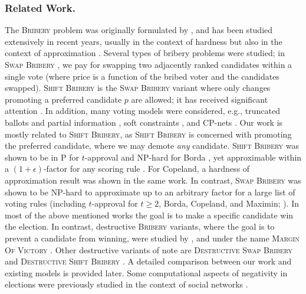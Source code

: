 \documentclass[letterpaper]{article} %
\newcommand{\Bribery}{\textsc{Bribery}}
\newcommand{\swapB}{\textsc{Swap Bribery}}
\newcommand{\shiftB}{\textsc{Shift Bribery}}
\newcommand{\DshiftB}{\textsc{Destructive} \shiftB{}}
\newcommand{\NP}{\mathrm{NP}}
\newcommand{\Pclass}{\mathrm{P}}
\begin{document}
\subsubsection{Related Work.}
The \Bribery{} problem was originally formulated by  \citet{faliszewski2006complexity,DBLP:journals/jair/FaliszewskiHH09}, and has been studied extensively in recent years, usually in the context of hardness \citep[see a survey by][]{DBLP:reference/choice/FaliszewskiR16} but also in the context of approximation \cite{DBLP:conf/atal/Faliszewski08, DBLP:journals/jair/KellerHH19a}. Several types of bribery problems were studied; in \swapB{} \cite{DBLP:conf/sagt/ElkindFS09,elkind2010approximation}, we pay for swapping two adjacently ranked candidates within a single vote (where price is a function of the bribed voter and the candidates swapped). \shiftB{} is the \swapB{} variant where only changes promoting a preferred candidate $p$ are allowed; it has received significant attention \cite{DBLP:journals/algorithmica/SchlotterFE17,DBLP:conf/aaai/FaliszewskiMS19,DBLP:conf/atal/MaushagenNRS18,DBLP:journals/iandc/BredereckCFNN16,DBLP:conf/aaai/BredereckFNT16,DBLP:journals/jair/BredereckFNT16}. In addition, many voting models were considered, e.g., truncated ballots and partial information \cite{baumeister2012campaigns,DBLP:conf/atal/BriskornER16}, soft constraints \cite{pini2013bribery}, and CP-nets \cite{mattei2012bribery,dorn2016hardness}.
Our work is mostly related to \shiftB{}, as \shiftB{} is concerned with promoting the preferred candidate, where we may demote \emph{any} candidate. \shiftB{} was shown to be in $\Pclass$ for $t$-approval and $\NP$-hard for Borda  \cite{DBLP:conf/sagt/ElkindFS09}, yet approximable within a $(1+\epsilon)$-factor for any scoring rule \cite{DBLP:conf/aaai/FaliszewskiMS19}. For Copeland, a hardness of approximation result was shown in the same work.
In contrast, \swapB{} was shown to be $\NP$-hard to approximate up to an arbitrary factor for a large list of voting rules (including $t$-approval for $t \geq 2$, Borda, Copeland, and Maximin; \citealt{elkind2010approximation}).
In most of the above mentioned works the goal is to make a specific candidate win the election. In contrast, destructive \textsc{Bribery} variants, where the goal is to prevent a candidate from winning, were studied by \citet*{DBLP:journals/jair/FaliszewskiHHR09}, and under the name \textsc{Margin Of Victory}  \cite{magrino2011computing,cary2011estimating,xia2012computing,dey2015estimating}.
Other destructive variants of note are
\textsc{Destructive Swap Bribery} \cite{shiryaev2013elections} and \DshiftB{} \cite{Kaczmarczyk2019destructive}. A detailed comparison between our work and existing models is provided later.
Some computational aspects of negativity in elections were previously  studied  in the context of social networks  \cite{DBLP:conf/ictcs/MehriziCCDP19,DBLP:conf/aaai/CastiglioniF020}.
\end{document}

